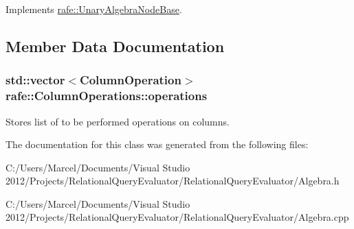 Implements \hyperlink{classrafe_1_1_unary_algebra_node_base_a6f554aad7250a0f15730d10ae24e4a79}{rafe\+::\+Unary\+Algebra\+Node\+Base}.



\subsection{Member Data Documentation}
\hypertarget{classrafe_1_1_column_operations_adb374c76426222828c5b1a6b0f225246}{
\subsubsection[{operations}]{\setlength{\rightskip}{0pt plus 5cm}std\+::vector$<${\bf Column\+Operation}$>$ rafe\+::\+Column\+Operations\+::operations}}\label{classrafe_1_1_column_operations_adb374c76426222828c5b1a6b0f225246}
Stores list of to be performed operations on columns. 

The documentation for this class was generated from the following files\+:\begin{DoxyCompactItemize}
\item 
C\+:/\+Users/\+Marcel/\+Documents/\+Visual Studio 2012/\+Projects/\+Relational\+Query\+Evaluator/\+Relational\+Query\+Evaluator/Algebra.\+h\item 
C\+:/\+Users/\+Marcel/\+Documents/\+Visual Studio 2012/\+Projects/\+Relational\+Query\+Evaluator/\+Relational\+Query\+Evaluator/Algebra.\+cpp\end{DoxyCompactItemize}
